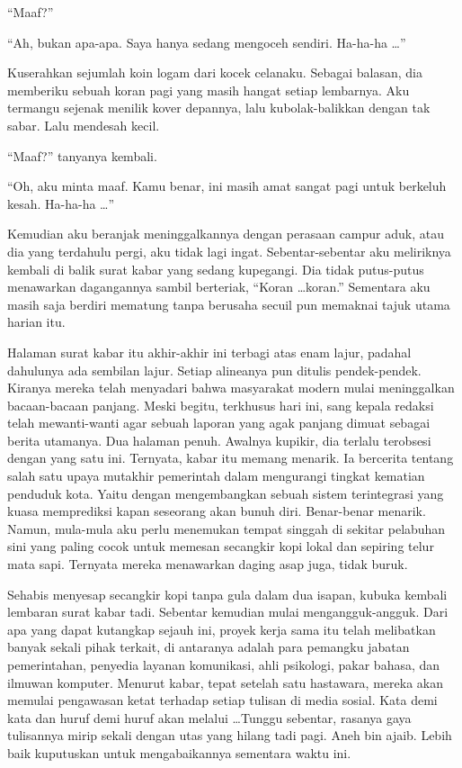 \documentclass[smalldemyvopaper,11pt,twoside,onecolumn,openright,extrafontsizes]{memoir}
\begin{document}
``Maaf?''

``Ah, bukan apa-apa. Saya hanya sedang mengoceh sendiri. Ha-ha-ha \dots''

Kuserahkan sejumlah koin logam dari kocek celanaku. Sebagai balasan, dia memberiku sebuah koran pagi yang masih hangat setiap lembarnya. Aku termangu sejenak menilik kover depannya, lalu kubolak-balikkan dengan tak sabar. Lalu mendesah kecil.

``Maaf?'' tanyanya kembali.


``Oh, aku minta maaf. Kamu benar, ini masih amat sangat pagi untuk berkeluh kesah. Ha-ha-ha \dots''


Kemudian aku beranjak meninggalkannya dengan perasaan campur aduk, atau dia yang terdahulu pergi, aku tidak lagi ingat. Sebentar-sebentar aku meliriknya kembali di balik surat kabar yang sedang kupegangi. Dia tidak putus-putus menawarkan dagangannya sambil berteriak, ``Koran \dots koran.'' Sementara aku masih saja berdiri mematung tanpa berusaha secuil pun memaknai tajuk utama harian itu.


Halaman surat kabar itu akhir-akhir ini terbagi atas enam lajur, padahal dahulunya ada sembilan lajur. Setiap alineanya pun ditulis pendek-pendek. Kiranya mereka telah menyadari bahwa masyarakat modern mulai meninggalkan bacaan-bacaan panjang. Meski begitu, terkhusus hari ini, sang kepala redaksi telah mewanti-wanti agar sebuah laporan yang agak panjang dimuat sebagai berita utamanya. Dua halaman penuh. Awalnya kupikir, dia terlalu terobsesi dengan yang satu ini. Ternyata, kabar itu memang menarik. Ia bercerita tentang salah satu upaya mutakhir pemerintah dalam mengurangi tingkat kematian penduduk kota. Yaitu dengan mengembangkan sebuah sistem terintegrasi yang kuasa memprediksi kapan seseorang akan bunuh diri. Benar-benar menarik. Namun, mula-mula aku perlu menemukan tempat singgah di sekitar pelabuhan sini yang paling cocok untuk memesan secangkir kopi lokal dan sepiring telur mata sapi. Ternyata mereka menawarkan daging asap juga, tidak buruk.


Sehabis menyesap secangkir kopi tanpa gula dalam dua isapan, kubuka kembali lembaran surat kabar tadi. Sebentar kemudian mulai mengangguk-angguk. Dari apa yang dapat kutangkap sejauh ini, proyek kerja sama itu telah melibatkan banyak sekali pihak terkait, di antaranya adalah para pemangku jabatan pemerintahan, penyedia layanan komunikasi, ahli psikologi, pakar bahasa, dan ilmuwan komputer. Menurut kabar, tepat setelah satu hastawara, mereka akan memulai pengawasan ketat terhadap setiap tulisan di media sosial. Kata demi kata dan huruf demi huruf akan melalui \dots Tunggu sebentar, rasanya gaya tulisannya mirip sekali dengan utas yang hilang tadi pagi. Aneh bin ajaib. Lebih baik kuputuskan untuk mengabaikannya sementara waktu ini.
\end{document}
